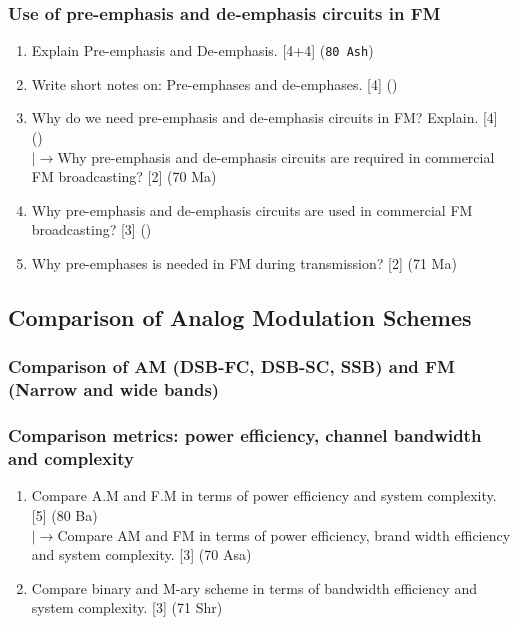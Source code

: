 \documentclass[12pt]{article}
\newcommand{\lb}{\\$\left|\rightarrow\right.$}
\begin{document}
    \subsubsection{Use of pre-emphasis and de-emphasis circuits in FM}
      \begin{enumerate}
        \item Explain Pre-emphasis and De-emphasis. \hfill [4+4] (\texttt{80 Ash})

        \item Write short notes on: Pre-emphases and de-emphases. \hfill [4] ()

        \item Why do we need pre-emphasis and de-emphasis circuits in FM? Explain. \hfill [4] ()
        \lb Why pre-emphasis and de-emphasis circuits are required in commercial FM broadcasting? \hfill [2] (70 Ma)

        \item Why pre-emphasis and de-emphasis circuits are used in commercial FM broadcasting? \hfill [3] ()

        \item Why pre-emphases is needed in FM during transmission? \hfill [2] (71 Ma)
      \end{enumerate}

  \subsection{Comparison of Analog Modulation Schemes}
    \subsubsection{Comparison of AM (DSB-FC, DSB-SC, SSB) and FM (Narrow and wide bands)}
    \subsubsection{Comparison metrics: power efficiency, channel bandwidth and complexity}
    	\begin{enumerate}
    		\item Compare A.M and F.M in terms of power efficiency and system complexity. \hfill [5] (80 Ba)
    		\lb Compare AM and FM in terms of power efficiency, brand width efficiency and system complexity. \hfill [3] (70 Asa)
    		
    		\item Compare binary and M-ary scheme in terms of bandwidth efficiency and system complexity. \hfill [3] (71 Shr)
    	\end{enumerate}
    
\end{document}
